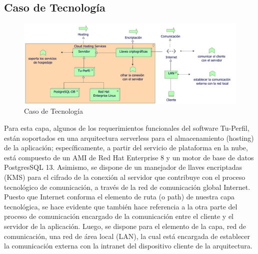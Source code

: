 \newpage

\subsection{Caso  de Tecnología}
\begin{figure}[h!]
	\centering
	\includegraphics[width=1\linewidth]{imgs/puntos_vista/tecnologia/tecnologia}
	\caption{Caso de Tecnología}
\end{figure}

Para esta capa, algunos de los requerimientos funcionales del software Tu-Perfil, están soportados en una arquitectura serverless para el almacenamiento (hosting) de la aplicación; específicamente, a partir del servicio de plataforma en la nube, está compuesto de un AMI de Red Hat Enterprise 8 y un motor de base de datos PostgresSQL 13.  Asimismo, se dispone de un manejador de llaves encriptadas (KMS) para el cifrado de la conexión al servidor que contribuye con el proceso tecnológico de comunicación, a través de la red de comunicación global Internet.\\ 

Puesto que Internet conforma el elemento de ruta (o path) de nuestra capa tecnológica, se hace evidente que también hace referencia a la otra parte del proceso de comunicación encargado de la comunicación entre el cliente y el servidor de la aplicación. Luego, se dispone para el elemento de la capa, red de comunicación, una red de área local (LAN), la cual está encargada de establecer la comunicación externa con la intranet del dispositivo cliente de la arquitectura.